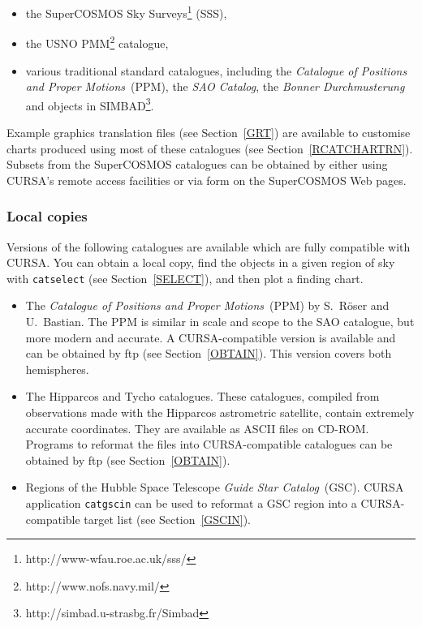 \documentclass[twoside,11pt]{article}
\newcommand{\htmladdnormallinkfoot}[2]{#1\footnote{#2}}
\renewcommand{\_}{\texttt{\symbol{95}}}
\begin{document}
\begin{itemize}

  \item the \htmladdnormallinkfoot{SuperCOSMOS Sky Surveys}
   {http://www-wfau.roe.ac.uk/sss/} (SSS),

  \item the \htmladdnormallinkfoot{USNO PMM}{http://www.nofs.navy.mil/}
   catalogue\cite{PMM},

  \item various traditional standard catalogues, including the {\it
   Catalogue of Positions and Proper Motions}\, (PPM)\cite{PPMN, PPMS},
   the {\it SAO Catalog}, the {\it Bonner Durchmusterung}\, and objects
   in \htmladdnormallinkfoot{SIMBAD}{http://simbad.u-strasbg.fr/Simbad}.

\end{itemize}

Example graphics translation files (see Section~\ref{GRT}) are available
to customise charts produced using most of these catalogues (see
Section~\ref{RCATCHARTRN}).  Subsets from the SuperCOSMOS catalogues can
be obtained by either using CURSA's remote access facilities or via form
on the SuperCOSMOS Web pages.

\subsubsection{Local copies}

Versions of the following catalogues are available which are fully
compatible with CURSA.  You can obtain a local copy, find the objects in
a given region of sky with {\tt catselect} (see Section~\ref{SELECT}), and
then plot a finding chart.

\begin{itemize}

  \item The {\it Catalogue of Positions and Proper Motions}\, (PPM)
   by S.~R\"{o}ser and U.~Bastian\cite{PPMN, PPMS}.  The PPM
   is similar in scale and scope to the SAO catalogue, but more modern
   and accurate.  A CURSA-compatible version is available and can be
   obtained by ftp (see Section~\ref{OBTAIN}).  This version covers both
   hemispheres.

  \item The Hipparcos and Tycho catalogues.  These catalogues, compiled
   from observations made with the Hipparcos astrometric satellite,
   contain extremely accurate coordinates.  They are available as
   ASCII files on CD-ROM.  Programs to reformat the files into
   CURSA-compatible catalogues can be obtained by ftp (see
   Section~\ref{OBTAIN}).

  \item Regions of the Hubble Space Telescope {\it Guide Star
   Catalog}\, (GSC).  CURSA application {\tt catgscin} can be used to
   reformat a GSC region into a CURSA-compatible target list (see
   Section~\ref{GSCIN}).

\end{itemize}
\end{document}
